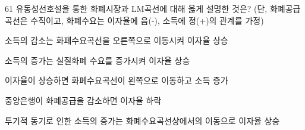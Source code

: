 \begin{question}{61}
유동성선호설을 통한 화폐시장과 LM곡선에 대해 옳게 설명한 것은? (단, 화폐공급곡선은 수직이고, 화폐수요는 이자율에 음(-), 소득에 정(+)의 관계를 가정)
\begin{choices}
  \item 소득의 감소는 화폐수요곡선을 오른쪽으로 이동시켜 이자율 상승
  \item 소득의 증가는 실질화폐 수요를 증가시켜 이자율 상승
  \item 이자율이 상승하면 화폐수요곡선이 왼쪽으로 이동하고 소득 증가
  \item 중앙은행이 화폐공급을 감소하면 이자율 하락
  \item 투기적 동기로 인한 소득의 증가는 화폐수요곡선상에서의 이동으로 이자율 상승
\end{choices}
\end{question}
